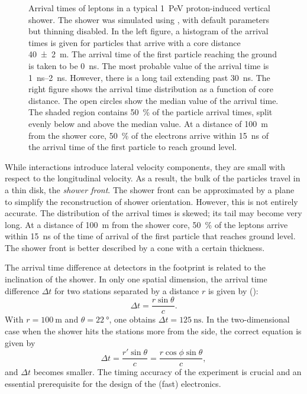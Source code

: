 \begin{figure}
\centering
{


}
\caption{  Arrival
times of leptons in a typical \SI{1}{\peta\electronvolt} proton-induced
vertical shower.  The shower was simulated using \aires, with default
parameters but thinning disabled.  In the left figure, a histogram of the
arrival times is given for particles that arrive with a core distance
\SI[separate-uncertainty=true]{40(2)}{\meter}.  The arrival time of the
first particle reaching the ground is taken to be \SI{0}{\nano\second}.
The most probable value of the arrival time is
\SIrange{1}{2}{\nano\second}.  However, there is a long tail extending
past \SI{30}{\nano\second}.  The right figure shows the arrival time
distribution as a function of core distance. The open circles show the
median value of the arrival time. The shaded region contains
\SI{50}{\percent} of the particle arrival times, split evenly below and
above the median value.  At a distance of \SI{100}{\meter} from the shower
core, \SI{50}{\percent} of the electrons arrive within
\SI{15}{\nano\second} of the arrival time of the first particle to reach
ground level.}
\label{fig:front-arrival-time}
\end{figure}
While interactions introduce lateral velocity components, they are small
with respect to the longitudinal velocity. As a result, the bulk of the
particles travel in a thin disk, the \emph{shower front}.  The shower front can be
approximated by a plane to simplify the reconstruction of shower
orientation.
However, this is not entirely accurate.
The distribution of the arrival times is skewed; its tail may become very long.
At a distance of \SI{100}{\meter} from the shower core, \SI{50}{\percent} of the
leptons arrive within \SI{15}{\nano\second} of the time of arrival of the first
particle that reaches ground level.  The shower front is better described
by a cone with a certain thickness.

\label{pg:shower-front-angle-time-spread}
The arrival time difference at detectors in the footprint is related to the
inclination of the shower. In only one spatial dimension, the arrival time
difference $\Delta t$ for two stations separated by a distance $r$ is given by
():
\begin{equation}
\Delta t = \frac{r \sin\theta}{c}.
\end{equation}
With $r = \SI{100}{\meter}$ and $\theta =
\SI{22}{\degree}$, one obtains $\Delta t = \SI{125}{\nano\second}$.  In the
two-dimensional case when the shower hits the stations more from the side, the
correct equation is given by
\begin{equation}
\Delta t = \frac{r' \sin\theta}{c} = \frac{r \cos\phi \sin\theta}{c},
\end{equation}
and $\Delta t$ becomes smaller. The timing accuracy of the experiment is
crucial and an essential prerequisite for the design of the (fast)
electronics.

